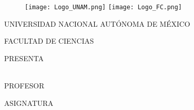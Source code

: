 
\thispagestyle{portada}
\begin{figure}[ht]
	\texttt{[image: Logo\_UNAM.png]}
	\label{EscudoUNAM}
	\endminipage
	\texttt{[image: Logo\_FC.png]}
	\label{EscudoFC}
	\endminipage
\end{figure}

\begin{center}
	\vspace{0.8cm}
	\LARGE
	UNIVERSIDAD NACIONAL AUTÓNOMA DE MÉXICO

	\vspace{0.8cm}
	\LARGE
	FACULTAD DE CIENCIAS

	\vspace{1.7cm}
	\Large
	\textbf{\tareaName}

	\vspace{1.3cm}
	\normalsize
	PRESENTA \\
	\vspace{.3cm}
	\large
	\textbf{\autorName}\\
	\vspace{.2cm}
	\textbf{\noCuenta}

	\vspace{1.3cm}
	\normalsize
	PROFESOR \\
	\vspace{.3cm}
	\large
	\textbf{\profeName}

	\vspace{1.3cm}
	\normalsize
	ASIGNATURA \\
	\vspace{.3cm}
	\large
	\textbf{\materiaName}

	\vspace{1.3cm}
	\fecha
\end{center}
